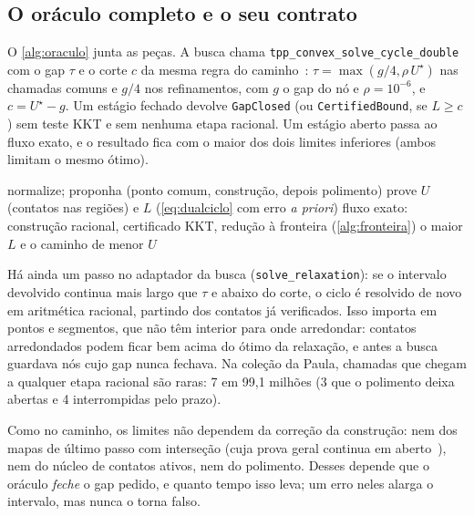 \documentclass[11pt,a4paper]{article}
\theoremstyle{plain}\newtheorem{proposicao}{Proposição}
\theoremstyle{definition}\newtheorem{definicao}{Definição}
\theoremstyle{plain}\newtheorem{teorema}{Teorema}
\theoremstyle{plain}\newtheorem{lema}{Lema}
\newcommand{\code}[1]{\texttt{\small #1}}
\begin{document}
\subsection{O oráculo completo e o seu contrato}\label{sec:oraculociclo}
O \cref{alg:oraculo} junta as peças. A busca chama \code{tpp\_convex\_solve\_cycle\_double} com o gap \(\tau\) e o corte \(c\) da mesma regra do caminho~\cite{oraculo}: \(\tau=\max(g/4,\rho\,U^\star)\) nas chamadas comuns e \(g/4\) nos refinamentos, com \(g\) o gap do nó e \(\rho=10^{-6}\), e \(c=U^\star-g\). Um estágio fechado devolve \code{GapClosed} (ou \code{CertifiedBound}, se \(L\ge c\)) sem teste KKT e sem nenhuma etapa racional. Um estágio aberto passa ao fluxo exato, e o resultado fica com o maior dos dois limites inferiores (ambos limitam o mesmo ótimo).

\begin{algorithm}[ht]\small
\caption{O oráculo de ciclo como a busca o chama (esquema).}\label{alg:oraculo}
\begin{algorithmic}[1]
    \State normalize; proponha (ponto comum, construção, depois polimento)
      \State prove $U$ (contatos nas regiões) e $L$ (\eqref{eq:dualciclo} com erro \emph{a priori})
    \EndFor
  \EndIf
  \State fluxo exato: construção racional, certificado KKT, redução à fronteira (\cref{alg:fronteira})
  \State \Return o maior $L$ e o caminho de menor $U$
\EndFunction
\end{algorithmic}
\end{algorithm}

Há ainda um passo no adaptador da busca (\code{solve\_relaxation}): se o intervalo devolvido continua mais largo que \(\tau\) e abaixo do corte, o ciclo é resolvido de novo em aritmética racional, partindo dos contatos já verificados. Isso importa em pontos e segmentos, que não têm interior para onde arredondar: contatos arredondados podem ficar bem acima do ótimo da relaxação, e antes a busca guardava nós cujo gap nunca fechava. Na coleção da Paula, chamadas que chegam a qualquer etapa racional são raras: 7 em 99,1 milhões (3 que o polimento deixa abertas e 4 interrompidas pelo prazo).

\begin{cuidado}
Como no caminho, os limites não dependem da correção da construção: nem dos mapas de último passo com interseção (cuja prova geral continua em aberto~\cite{tutorial}), nem do núcleo de contatos ativos, nem do polimento. Desses depende que o oráculo \emph{feche} o gap pedido, e quanto tempo isso leva; um erro neles alarga o intervalo, mas nunca o torna falso.
\end{cuidado}
\end{document}
